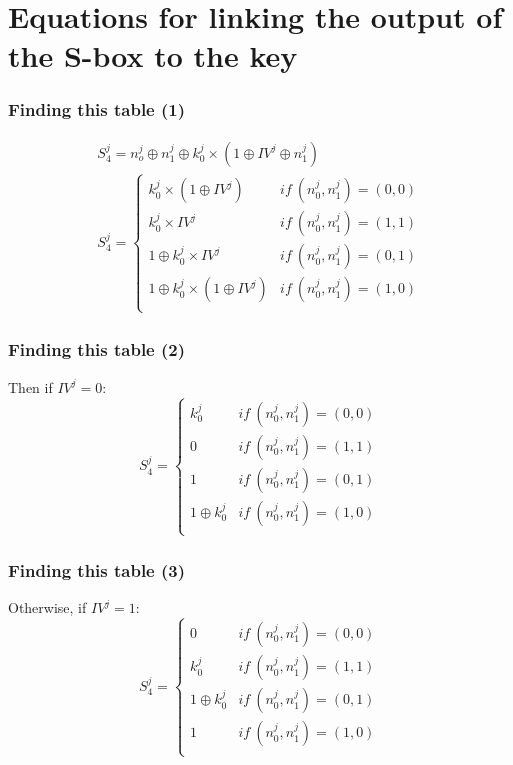 \documentclass{beamer}
\begin{document}
	
	\appendix
	 
	
	
	\section{Equations for linking the output of the S-box to the key}
	\begin{frame}
		\frametitle{Finding this table (1)}
		\begin{gather*}
			S_4^j = n_o^j \oplus n_1^j \oplus k_0^j \times (1 \oplus IV^j \oplus n_1^j)\\
			S _4^j =\left \{	
			\begin{array}{ll}
				k_0^j \times (1 \oplus IV^j) & if\ (n_0^j,n_1^j)=(0,0)\\
				k_0^j \times IV^j & if\ (n_0^j,n_1^j)=(1,1)\\
				1 \oplus k_0^j \times IV^j & if\ (n_0^j,n_1^j)=(0,1)\\
				1 \oplus k_0^j \times (1 \oplus IV^j) & if\ (n_0^j,n_1^j)=(1,0)\\
			\end{array}
			\right.
		\end{gather*}
	\end{frame}
	
	\begin{frame}
		\frametitle{Finding this table (2)}
		\noindent Then if $IV^j = 0$: 
		$$S _4^j =\left \{	
		\begin{array}{ll}
			k_0^j& if\ (n_0^j,n_1^j)=(0,0)\\
			0& if\ (n_0^j,n_1^j)=(1,1)\\
			1& if\ (n_0^j,n_1^j)=(0,1)\\
			1 \oplus k_0^j& if\ (n_0^j,n_1^j)=(1,0)\\
		\end{array}
		\right.$$
	\end{frame}
	
	\begin{frame}
		\frametitle{Finding this table (3)}
		\noindent Otherwise, if $IV^j = 1$:
		$$S _4^j =\left \{	
		\begin{array}{ll}
			0& if\ (n_0^j,n_1^j)=(0,0)\\
			k_0^j& if\ (n_0^j,n_1^j)=(1,1)\\
			1 \oplus k_0^j& if\ (n_0^j,n_1^j)=(0,1)\\
			1& if\ (n_0^j,n_1^j)=(1,0)\\
		\end{array}
		\right.$$
	\end{frame}
	
\end{document}
